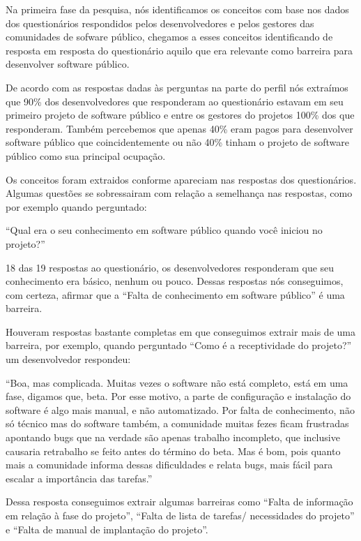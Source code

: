 Na primeira fase da pesquisa, nós identificamos os conceitos com base nos dados 
dos questionários respondidos pelos desenvolvedores e pelos gestores das comunidades de
sofware público, chegamos a esses conceitos identificando de resposta em resposta 
do questionário aquilo que era relevante como barreira para desenvolver 
software público.

De acordo com as respostas dadas às perguntas na parte do perfil nós extraímos
que 90\% dos desenvolvedores que responderam ao questionário estavam 
em seu primeiro projeto de software público e entre os gestores do projetos
100\% dos que responderam. Também percebemos que apenas
40\% eram pagos para desenvolver software público que coincidentemente ou não
40\% tinham o projeto de software público como sua principal ocupação.

Os conceitos foram extraidos conforme apareciam nas respostas dos questionários.
Algumas questões se sobressairam com relação a semelhança nas respostas, como 
por exemplo quando perguntado:

``Qual era o seu conhecimento em software público 
quando você iniciou no projeto?''

18 das 19 respostas ao questionário, os desenvolvedores
responderam que seu conhecimento era básico, nenhum ou pouco. Dessas respostas 
nós conseguimos, com certeza, afirmar que a ``Falta de conhecimento em software público''
é uma barreira.

Houveram respostas bastante completas em que conseguimos extrair mais de uma barreira,
por exemplo, quando perguntado ``Como é a receptividade do projeto?'' um desenvolvedor
respondeu: 

``Boa, mas complicada. Muitas vezes o software não está completo, está em uma 
fase, digamos que, beta. Por esse motivo, a parte de configuração e instalação 
do software é algo mais manual, e não automatizado. Por falta de conhecimento, 
não só técnico mas do software também, a comunidade muitas fezes ficam frustradas 
apontando bugs que na verdade são apenas trabalho incompleto, que inclusive 
causaria retrabalho se feito antes do término do beta. Mas é bom, pois quanto mais 
a comunidade informa dessas dificuldades e relata bugs, mais fácil para escalar a 
importância das tarefas.''

Dessa resposta conseguimos extrair algumas barreiras 
como ``Falta de informação em relação à fase do projeto'', ``Falta de lista de tarefas/
necessidades do projeto'' e ``Falta de manual de implantação do projeto''.

